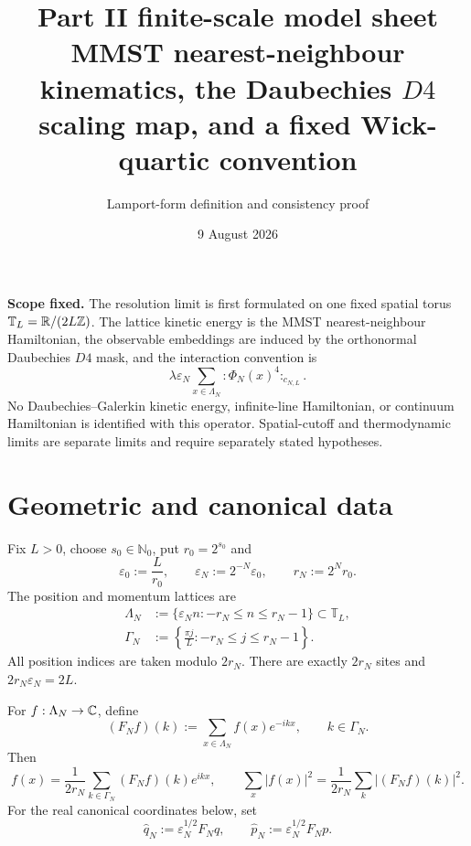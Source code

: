 \documentclass[11pt,a4paper]{article}
\title{Part II finite-scale model sheet\\[3pt]
\large MMST nearest-neighbour kinematics, the Daubechies \(D4\) scaling map, and a fixed Wick-quartic convention}
\author{Lamport-form definition and consistency proof}
\date{9 August 2026}
\newcommand{\eps}{\varepsilon}
\newcommand{\T}{\mathbb T}
\begin{document}
\maketitle

\begin{resultbox}
\textbf{Scope fixed.}  The resolution limit is first formulated on one fixed spatial
torus \(\T_L=\R/(2L\mathbb Z)\).  The lattice kinetic energy is the MMST
nearest-neighbour Hamiltonian, the observable embeddings are induced by the orthonormal
Daubechies \(D4\) mask, and the interaction convention is
\[
 \lambda\eps_N\sum_{x\in\Lambda_N}{:}\Phi_N(x)^4{:}_{c_{N,L}}.
\]
No Daubechies--Galerkin kinetic energy, infinite-line Hamiltonian, or continuum
Hamiltonian is identified with this operator.  Spatial-cutoff and thermodynamic limits
are separate limits and require separately stated hypotheses.
\end{resultbox}

\tableofcontents

\section{Geometric and canonical data}


Fix \(L>0\), choose \(s_0\in\mathbb N_0\), put \(r_0=2^{s_0}\) and
\[
 \eps_0:=\frac{L}{r_0},\qquad
 \eps_N:=2^{-N}\eps_0,\qquad r_N:=2^Nr_0.                         \tag{1.1}
\]
The position and momentum lattices are
\begin{align}
 \Lambda_N&:=\{\eps_Nn:-r_N\le n\le r_N-1\}\subset\T_L,\\
 \Gamma_N&:=\left\{\frac{\pi j}{L}:-r_N\le j\le r_N-1\right\}.
                                                                    \tag{1.2}
\end{align}
All position indices are taken modulo \(2r_N\).  There are exactly \(2r_N\)
sites and \(2r_N\eps_N=2L\).


For \(f:\Lambda_N\to\mathbb C\), define
\[
 (F_Nf)(k):=\sum_{x\in\Lambda_N}f(x)e^{-ikx},\qquad k\in\Gamma_N. \tag{1.3}
\]
Then
\[
 f(x)=\frac1{2r_N}\sum_{k\in\Gamma_N}(F_Nf)(k)e^{ikx},\qquad
 \sum_x|f(x)|^2=\frac1{2r_N}\sum_k|(F_Nf)(k)|^2.                 \tag{1.4}
\]
For the real canonical coordinates below, set
\[
 \widehat q_N:=\eps_N^{1/2}F_Nq,\qquad
 \widehat p_N:=\eps_N^{1/2}F_Np.                                \tag{1.5}
\]
\end{document}
